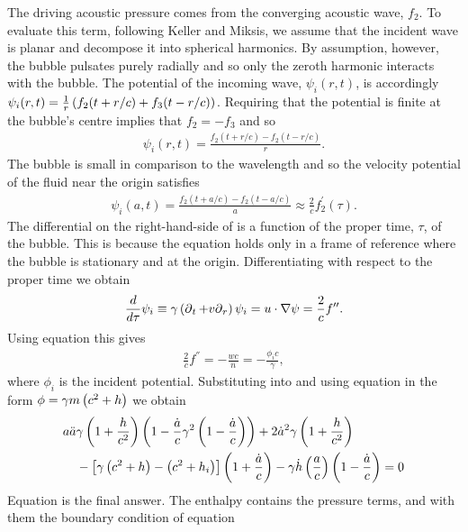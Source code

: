 The driving acoustic pressure comes from the converging acoustic wave, $f_2$.
To evaluate this term, following Keller and Miksis, 
we assume that the incident wave is planar and decompose it into  spherical harmonics.
By assumption, however, the bubble pulsates purely radially and so only the zeroth harmonic interacts with the bubble.
The potential of the incoming wave, $\psi_i (r,t)$, is accordingly 
  $\psi_i (r,t) = \frac{1}{r}\left( f_2(t+r/c) + f_3(t-r/c) \right)$.
Requiring that the potential is finite at the bubble's centre implies that  $f_2 = -f_3$ and so
\begin{align}
  \psi_i (r,t) = \frac{f_2(t+r/c) - f_2(t-r/c)}{r}.
\end{align}
The bubble is small in comparison to the wavelength and so the velocity potential of the fluid near the origin satisfies
\begin{align}
  \label{eqn:Tau}
 \psi_i (a,t) = \frac{f_2(t+a/c) - f_2(t-a/c)}{a} \approx \frac{2}{c}f_2^\prime(\tau).
\end{align}
The differential on the right-hand-side of  is a function of the proper time, $\tau$, of the bubble.
This is because the equation holds only in a frame of reference where the bubble is stationary and at the origin.
Differentiating  with respect to the proper time we obtain
\begin{align}
  \frac{d}{d \tau} \psi_i \equiv \gamma \left( \operatorname{\partial}_t+ v{\operatorname{\partial}_r}  \right) \psi_i = u \cdot \nabla \psi = \frac{2}{c}f^{\prime\prime}.
\end{align}
Using equation   this gives
\begin{align}
\frac{2}{c}f^\dprime =-\frac{wc}{n}= - \frac{\phi_i c}{\gamma}, \label{eqn:IncidentWave}
\end{align}
where $\phi_i$ is the incident  potential.
Substituting   into  and using equation  in the form $\phi = \gamma m\left( c^2 + h \right)$ we obtain
\begin{align}
  a \ddot a & \gamma \left( 1 + \frac{h}{c^2} \right)\left( 1 - \frac{\dot a}{c}\gamma^2\left( 1- \frac{\dot a}{c} \right) \right)+ 2 {\dot a}^2\gamma\left( 1 + \frac{h}{c^2} \right)\nonumber\\
  &- \left[ \gamma\left( c^2 + h \right) - \left( c^2 + h_i \right) \right]\left( 1 + \frac{\dot a}{c} \right)- \gamma \dot h \left( \frac{a}{c} \right)\left( 1 - \frac{\dot a}{c} \right)
= 0\label{eqn:RKM}
\end{align}
Equation  is the final answer. The enthalpy contains the pressure terms, and with them the boundary condition of equation 


